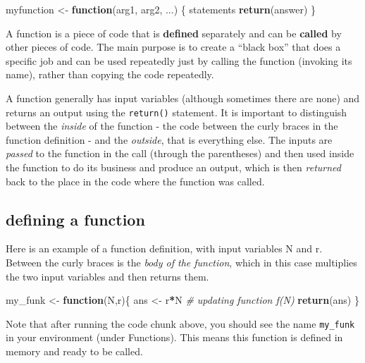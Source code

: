 \documentclass[
]{book}
\newenvironment{Shaded}{\begin{snugshade}}{\end{snugshade}}
\newcommand{\CommentTok}[1]{\textcolor[rgb]{0.56,0.35,0.01}{\textit{#1}}}
\newcommand{\ControlFlowTok}[1]{\textcolor[rgb]{0.13,0.29,0.53}{\textbf{#1}}}
\newcommand{\KeywordTok}[1]{\textcolor[rgb]{0.13,0.29,0.53}{\textbf{#1}}}
\newcommand{\NormalTok}[1]{#1}
\newcommand{\OperatorTok}[1]{\textcolor[rgb]{0.81,0.36,0.00}{\textbf{#1}}}
\newcommand{\StringTok}[1]{\textcolor[rgb]{0.31,0.60,0.02}{#1}}
\theoremstyle{definition}
\theoremstyle{definition}
\theoremstyle{definition}
\theoremstyle{remark}
\begin{document}
\begin{Shaded}
\begin{Highlighting}[]
\NormalTok{myfunction \textless{}{-}}\StringTok{ }\ControlFlowTok{function}\NormalTok{(arg1, arg2, ...) \{}
\NormalTok{    statements}
    \KeywordTok{return}\NormalTok{(answer)}
\NormalTok{\}}
\end{Highlighting}
\end{Shaded}

A function is a piece of code that is \textbf{defined} separately and can be \textbf{called} by other pieces of code. The main purpose is to create a ``black box'' that does a specific job and can be used repeatedly just by calling the function (invoking its name), rather than copying the code repeatedly.

A function generally has input variables (although sometimes there are none) and returns an output using the \texttt{return()} statement. It is important to distinguish between the \emph{inside} of the function - the code between the curly braces in the function definition - and the \emph{outside}, that is everything else. The inputs are \emph{passed} to the function in the call (through the parentheses) and then used inside the function to do its business and produce an output, which is then \emph{returned} back to the place in the code where the function was called.

\hypertarget{defining-a-function}{%
\subsection{defining a function}\label{defining-a-function}}

Here is an example of a function definition, with input variables N and r. Between the curly braces is the \emph{body of the function}, which in this case multiplies the two input variables and then returns them.

\begin{Shaded}
\begin{Highlighting}[]
\NormalTok{my\_funk \textless{}{-}}\StringTok{ }\ControlFlowTok{function}\NormalTok{(N,r)\{ }
\NormalTok{  ans \textless{}{-}}\StringTok{ }\NormalTok{r}\OperatorTok{*}\NormalTok{N }\CommentTok{\# updating function f(N)}
  \KeywordTok{return}\NormalTok{(ans)}
\NormalTok{\}}
\end{Highlighting}
\end{Shaded}

Note that after running the code chunk above, you should see the name \texttt{my\_funk} in your environment (under Functions). This means this function is defined in memory and ready to be called.
\end{document}
